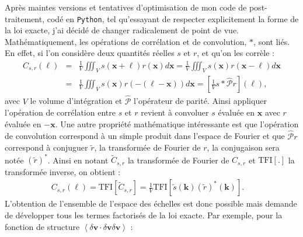 Après maintes versions et tentatives d'optimisation de mon code de post-traitement, codé en \verb|Python|, tel qu'essayant de respecter explicitement la forme de la loi exacte, j'ai décidé de changer radicalement de point de vue. 
Mathématiquement, les opérations de corrélation et de convolution, $*$, sont liés. En effet, si l'on considère deux quantités réelles $s$ et $r$, et qu'on les corrèle :
\begin{eqnarray}
     C_{s,r}(\boldsymbol{\ell})  &=& \frac{1}{V}\iiint_V s(\boldsymbol{x} + \boldsymbol{\ell}) r (\boldsymbol{x}) d\boldsymbol{x} =  \frac{1}{V} \iiint_V s(\boldsymbol{x}) r (\boldsymbol{x} - \boldsymbol{\ell}) d\boldsymbol{x} \nonumber\\
     &=&  \frac{1}{V} \iiint_V s(\boldsymbol{x}) r (-(\boldsymbol{\ell}-\boldsymbol{x}) ) d\boldsymbol{x} = \left[ \frac{1}{V} s * \mathcal{\hat{P}}r \right](\boldsymbol{\ell}),
\end{eqnarray}
avec $V$ le volume d'intégration et $\mathcal{\hat{P}}$ l'opérateur de parité.
Ainsi appliquer l'opération de corrélation entre $s$ et $r$ revient à convoluer $s$ évaluée en $\boldsymbol{x}$ avec $r$ évaluée en $-\boldsymbol{x}$.
Une autre propriété mathématique intéressante est que l'opération de convolution correspond à un simple produit dans l'espace de Fourier et que $\mathcal{\hat{P}}r$ correspond à conjuguer $\widetilde{r}$, la transformée de Fourier de $r$, la conjugaison sera notée $(\widetilde{r})^*$. Ainsi en notant $\widetilde{C}_{s,r}$ la transformée de Fourier de $C_{s,r}$ et $\text{TFI}[.]$ la transformée inverse, on obtient : 
\begin{eqnarray}
    C_{s,r}(\boldsymbol{\ell})  = \text{TFI}[\widetilde{C}_{s,r}] =  \frac{1}{V}\text{TFI}[\widetilde{s} (\boldsymbol{k}) ( \widetilde{r})^*(\boldsymbol{k})]. \quad
\end{eqnarray}
L'obtention de l'ensemble de l'espace des échelles est donc possible mais demande de développer tous les termes factorisés de la loi exacte. Par exemple, pour la fonction de structure $\left<\delta \boldsymbol{v} \cdot \delta \boldsymbol{v} \delta \boldsymbol{v}\right> $ :
